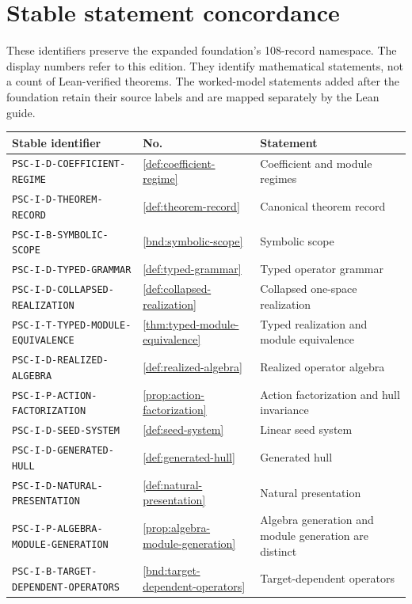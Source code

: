 \documentclass[11pt]{article}
\theoremstyle{definition}
\theoremstyle{remark}
\theoremstyle{definition}\newtheorem{example}[theorem]{Example}
\begin{document}
\section{Stable statement concordance}\label{app:stable-concordance}
These identifiers preserve the expanded foundation's 108-record namespace. The display numbers refer to this edition. They identify mathematical statements, not a count of Lean-verified theorems. The worked-model statements added after the foundation retain their source labels and are mapped separately by the Lean guide.
\small\begin{longtable}{@{}p{}p{}p{}@{}}
\toprule Stable identifier & No. & Statement\\\midrule\endhead
\nolinkurl{PSC-I-D-COEFFICIENT-REGIME} & \ref{def:coefficient-regime} & Coefficient and module regimes \\
\nolinkurl{PSC-I-D-THEOREM-RECORD} & \ref{def:theorem-record} & Canonical theorem record \\
\nolinkurl{PSC-I-B-SYMBOLIC-SCOPE} & \ref{bnd:symbolic-scope} & Symbolic scope \\
\nolinkurl{PSC-I-D-TYPED-GRAMMAR} & \ref{def:typed-grammar} & Typed operator grammar \\
\nolinkurl{PSC-I-D-COLLAPSED-REALIZATION} & \ref{def:collapsed-realization} & Collapsed one-space realization \\
\nolinkurl{PSC-I-T-TYPED-MODULE-EQUIVALENCE} & \ref{thm:typed-module-equivalence} & Typed realization and module equivalence \\
\nolinkurl{PSC-I-D-REALIZED-ALGEBRA} & \ref{def:realized-algebra} & Realized operator algebra \\
\nolinkurl{PSC-I-P-ACTION-FACTORIZATION} & \ref{prop:action-factorization} & Action factorization and hull invariance \\
\nolinkurl{PSC-I-D-SEED-SYSTEM} & \ref{def:seed-system} & Linear seed system \\
\nolinkurl{PSC-I-D-GENERATED-HULL} & \ref{def:generated-hull} & Generated hull \\
\nolinkurl{PSC-I-D-NATURAL-PRESENTATION} & \ref{def:natural-presentation} & Natural presentation \\
\nolinkurl{PSC-I-P-ALGEBRA-MODULE-GENERATION} & \ref{prop:algebra-module-generation} & Algebra generation and module generation are distinct \\
\nolinkurl{PSC-I-B-TARGET-DEPENDENT-OPERATORS} & \ref{bnd:target-dependent-operators} & Target-dependent operators \\

\end{longtable}
\end{document}
